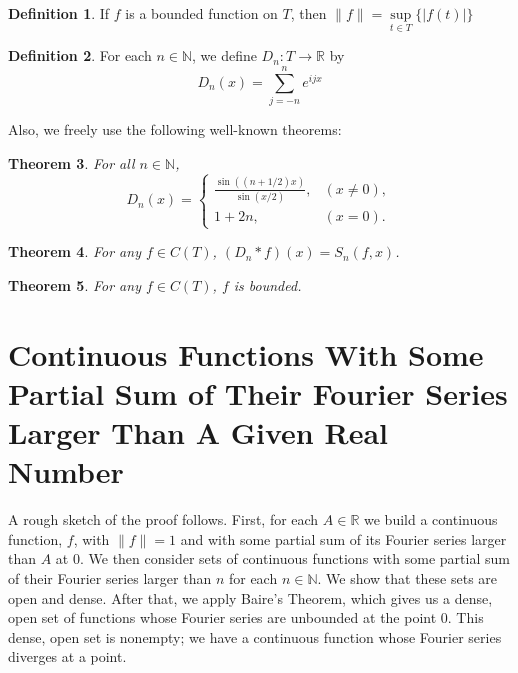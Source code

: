 \documentclass{amsart}
\newcommand{\N}{\mathbb{N}}
\newcommand{\R}{\mathbb{R}}
\newcommand{\absval}[1]{\left| #1 \right|}
\newcommand{\norm}[1]{\|#1\|}
\newtheorem{thm}{Theorem}[section]
\theoremstyle{definition}
\newtheorem{definition}[thm]{Definition}
\begin{document}
\begin{definition}
If $f$ is a bounded function on $T$, then $\norm{f} = \sup\limits_{t \in T} \{\absval{f(t)}\}$
\end{definition}

\begin{definition}
For each $n \in \N$, we define $D_n: T \to \R$ by
\begin{displaymath}
   D_n(x) = \sum\limits_{j=-n}^n e^{ijx}
\end{displaymath} 
\end{definition}

Also, we freely use the following well-known theorems:

\begin{thm}
For all $n \in \N$, 
\begin{displaymath}
   D_n(x) = \left\{
     \begin{array}{lr}
       \frac{\sin((n+1/2)x)}{\sin(x/2)}, &(x \neq 0),\\
       1+2n, &(x=0).
     \end{array}
   \right.
\end{displaymath}
\end{thm}

\begin{thm}
For any $f \in C(T)$, $(D_n \ast f)(x) = S_n(f,x)$. 
\end{thm}

\begin{thm}
For any $f \in C(T)$, $f$ is bounded.
\end{thm}

\section{Continuous Functions With Some Partial Sum of Their Fourier Series Larger Than A Given Real Number}

A rough sketch of the proof follows. 
First, for each $A \in \R$ we build a continuous function, $f$, with $\norm{f} = 1$ and with some partial sum of its Fourier series larger than $A$ at $0$. 
We then consider sets of continuous functions with some partial sum of their Fourier series larger than $n$ for each $n \in \N$.
We show that these sets are open and dense. 
After that, we apply Baire's Theorem, which gives us a dense, open set of functions whose Fourier series are unbounded at the point $0$. 
This dense, open set is nonempty; we have a continuous function whose Fourier series diverges at a point.
\end{document}
